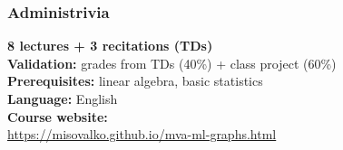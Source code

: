 \documentclass{beamer}
\begin{document}
\begin{frame}

\frametitle{Administrivia}

\textbf{8 lectures + 3 recitations (TDs)}\\[0.5em]

\textbf{Validation:} grades from TDs (40\%) + class project (60\%) \\[0.7em]

\textbf{Prerequisites:} linear algebra, basic statistics \\[0.7em]

\textbf{Language:} English \\[0.7em]

\textbf{Course website:}\\[-0.5em]
{\scriptsize\url{https://misovalko.github.io/mva-ml-graphs.html}} \\[0.5em]


\end{frame}



\MakeLastSlide
\end{document}

